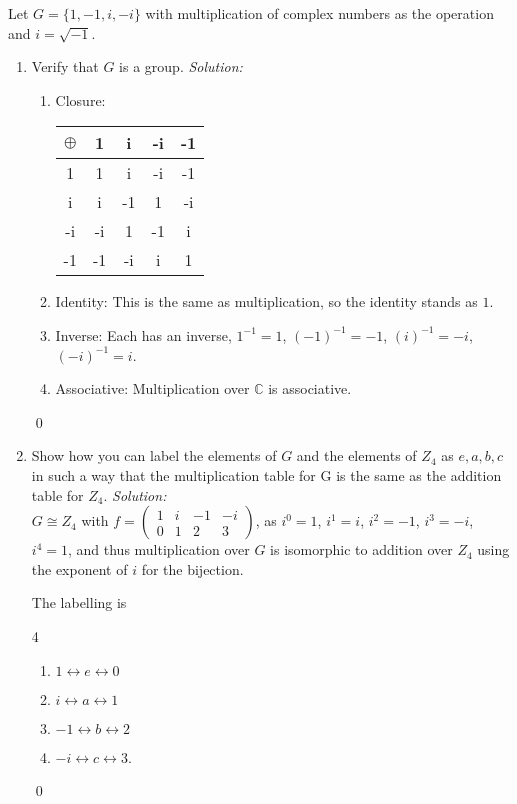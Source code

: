 \documentclass[12 pt]{article}
\newenvironment{problem}[2][Problem]{\begin{trivlist}
\item[\hskip \labelsep {\bfseries #1}\hskip \labelsep {\bfseries #2.}]}{\end{trivlist}}
\newenvironment{sol}
    {\emph{Solution:}
    }
    {
    \qed
    }
\theoremstyle{definition}
\newcommand{\C}{\mathbb{C}} %
\newcommand{\perm}[2]{\begin{pmatrix}#1\\#2\end{pmatrix}}
\begin{document}
\begin{problem}{4}
Let $G = \{1, -1, i, -i\}$ with multiplication of complex numbers as
the operation and $i=\sqrt{-1}$.
\begin{enumerate}[label=\alph*)]
    \item Verify that $G$ is a group. \begin{sol}
    \begin{enumerate}
        \item Closure:
        
        \begin{center}
\renewcommand\arraystretch{1.5}
\setlength\doublerulesep{0pt}
\begin{tabular}{c||c c c c}
$\oplus$ & 1 & i & -i & -1 \\
\hline\hline
1 & 1 & i & -i & -1 \\ 
\hline
i & i & -1 & 1 & -i \\ 
\hline
-i & -i & 1 & -1 & i \\ 
\hline
-1 & -1 & -i & i & 1 \\ 
\end{tabular}
\end{center}
        \item Identity: This is the same as multiplication, so the identity stands as $1$.
        \item Inverse: Each has an inverse, $1^{-1} = 1$, $(-1)^{-1}=-1$, $(i)^{-1}=-i$, $(-i)^{-1}=i$.
        \item Associative: Multiplication over $\C$ is associative.
    \end{enumerate}
    \end{sol}


\item Show how you can label the elements of $G$ and the elements of
$Z_4$ as $e, a, b, c$ in such a way that the multiplication table for G is the
same as the addition table for $Z_4$. \begin{sol}\\
$G \cong Z_4$ with $f = \perm{1 & i & -1 & -i}{0&1&2&3}$, as $i^0=1$, $i^1=i$, $i^2=-1$, $i^3=-i$, $i^4=1$, and thus multiplication over $G$ is isomorphic to addition over $Z_4$ using the exponent of $i$ for the bijection.


The labelling is 
\begin{multicols}{4}
\begin{enumerate}
    \item $1 \leftrightarrow e \leftrightarrow 0$
    \item $i\leftrightarrow a \leftrightarrow 1$
    \item $-1 \leftrightarrow b \leftrightarrow 2$
    \item $-i \leftrightarrow c \leftrightarrow 3$.
\end{enumerate}
\end{multicols}



\end{sol}
\end{enumerate}
\end{problem}
\end{document}
